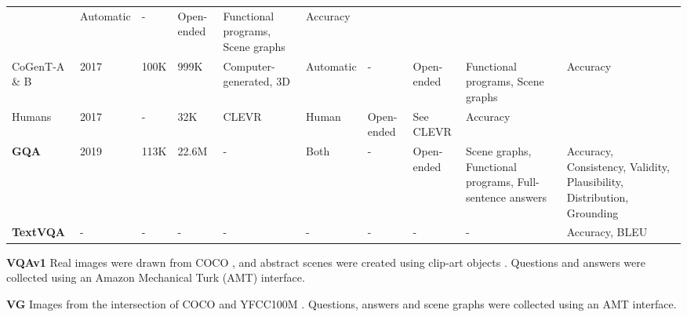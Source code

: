 \begin{landscape}
\begin{footnotesize}
\begin{center}
\begin{longtable}[c]{llllllllll}
          & Automatic
          & -
          & Open-ended
          & Functional programs, Scene graphs
          & Accuracy \\
          CoGenT-A \& B
          & 2017
          & 100K
          & 999K
          & Computer-generated, 3D 
          & Automatic
          & -
          & Open-ended
          & Functional programs, Scene graphs
          & Accuracy \\
          Humans
          & 2017
          & -
          & 32K  %
          & CLEVR
          & Human
          & Open-ended
          & See CLEVR
          & Accuracy \\
          \textbf{GQA} \cite{hudson2019gqa}
          & 2019
          & 113K  %
          & 22.6M  %
          & -
          & Both
          & -
          & Open-ended
          & Scene graphs, Functional programs, Full-sentence answers
          & Accuracy, Consistency, Validity, Plausibility, Distribution, Grounding \\
          \textbf{TextVQA} \cite{singh2019towards}
          & -
          & -
          & -
          & -
          & -
          & -
          & -
          & -
          & Accuracy, BLEU \\
          \end{longtable}
      \end{center}
  \end{footnotesize}
\end{landscape}


\textbf{VQAv1} \cite{antol2015vqa} Real images were drawn from COCO \cite{lin2014microsoft}, and abstract scenes were created using clip-art objects \cite{zitnick2013bringing}. Questions and answers were collected using an Amazon Mechanical Turk (AMT) interface.

\textbf{VG} \cite{krishna2017visual} Images from the intersection of COCO \cite{lin2014microsoft} and YFCC100M \cite{thomee2016yfcc100m}. Questions, answers and scene graphs were collected using an AMT interface.

